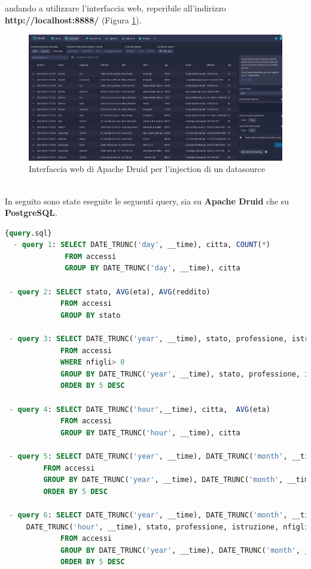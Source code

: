 andando a utilizzare l'interfaccia web, reperibile all'indirizzo
\textbf{http://localhost:8888/} (Figura \ref{fig:injection}).
\begin{figure}[h]
  \centering
  \includegraphics[width=1\textwidth]{images/percorso/load_data.png}
  \caption{Interfaccia web di Apache Druid per l'injection di un datasource}
  \label{fig:injection}
\end{figure}
\pagebreak
\\
In seguito sono state eseguite le seguenti query, sia su \textbf{Apache Druid} che su \textbf{PostgreSQL}.
\begin{lstlisting}[language=SQL, caption=\texttt{query.sql}, label=lst:file]{query.sql}
  - query 1: SELECT DATE_TRUNC('day', __time), citta, COUNT(*)
              FROM accessi
              GROUP BY DATE_TRUNC('day', __time), citta
       
 - query 2: SELECT stato, AVG(eta), AVG(reddito)
             FROM accessi
             GROUP BY stato
       
 - query 3: SELECT DATE_TRUNC('year', __time), stato, professione, istruzione, nfigli, COUNT(*)
             FROM accessi
             WHERE nfigli> 0
             GROUP BY DATE_TRUNC('year', __time), stato, professione, istruzione, nfigli
             ORDER BY 5 DESC
       
 - query 4: SELECT DATE_TRUNC('hour',__time), citta,  AVG(eta)
             FROM accessi
             GROUP BY DATE_TRUNC('hour', __time), citta  
 
 - query 5: SELECT DATE_TRUNC('year', __time), DATE_TRUNC('month', __time), DATE_TRUNC('day', __time), stato, professione, istruzione, nfigli, COUNT(*) 
         FROM accessi
         GROUP BY DATE_TRUNC('year', __time), DATE_TRUNC('month', __time), DATE_TRUNC('day', __time), stato, professione, istruzione, nfigli
         ORDER BY 5 DESC

 - query 6: SELECT DATE_TRUNC('year', __time), DATE_TRUNC('month', __time), DATE_TRUNC('day', __time), 
     DATE_TRUNC('hour', __time), stato, professione, istruzione, nfigli, COUNT(*) 
             FROM accessi
             GROUP BY DATE_TRUNC('year', __time), DATE_TRUNC('month', __time), DATE_TRUNC('day', __time), DATE_TRUNC('hour', __time), stato, professione, istruzione, nfigli
             ORDER BY 5 DESC           
 \end{lstlisting}
 \pagebreak

